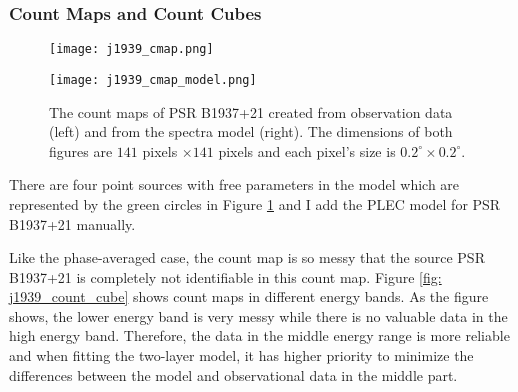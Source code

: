 \documentclass[a4paper, 12pt]{report}
\begin{document}
      \subsubsection{Count Maps and Count Cubes}
        \begin{figure}[!ht]
          \begin{center}
          \begin{minipage}{0.45\textwidth}
            \begin{center} 
              \texttt{[image: j1939\_cmap.png]}
            \end{center}
          \end{minipage}
          \begin{minipage}{0.45\textwidth}
            \begin{center}
              \texttt{[image: j1939\_cmap\_model.png]}
            \end{center}
          \end{minipage}
          \end{center}
          \caption[The count maps of PSR B1937+21 created from observation 
                  data (left) and from the spectra model (right).]
              {The count maps of PSR B1937+21 created from observation 
              data (left) and from the spectra model (right). The dimensions
              of both figures are $141$ pixels $\times 141$ pixels and each pixel's size is
              $0.2^{\circ}\times0.2^{\circ}$.}
            \label{fig: j1939_count_map}
        \end{figure}

        There are four point sources with free parameters in the model which are represented 
        by the green circles in Figure \ref{fig: j1939_count_map} and I add the PLEC model 
        for PSR B1937+21 manually. 

        Like the phase-averaged case, the count map is so messy that the source PSR B1937+21 
        is completely not identifiable in this count map.  
        Figure \ref{fig: j1939_count_cube} shows count maps in different energy bands. As 
        the figure shows, the lower energy band is very messy while there is no valuable  
        data in the high energy band. Therefore, the data in the middle energy range is 
        more reliable and when fitting the two-layer model, it has higher priority to 
        minimize the differences between the model and observational data in the middle part.
\end{document}
